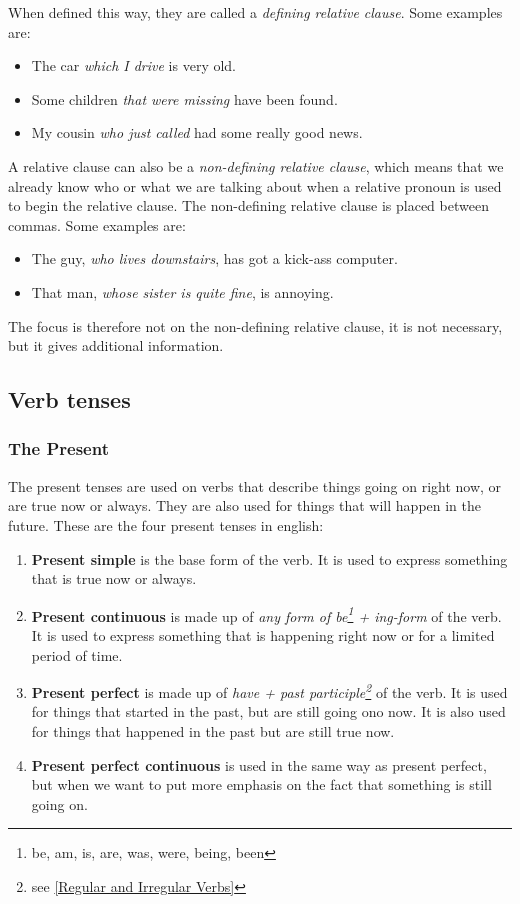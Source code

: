 When defined this way, they are called a \textit{defining relative clause}. Some examples are:

\begin{itemize}
    \item The car \textit{which I drive} is very old. 
    \item Some children \textit{that were missing} have been found.
    \item My cousin \textit{who just called} had some really good news.
\end{itemize}

A relative clause can also be a \textit{non-defining relative clause}, which means that we already know who or what we are talking about when a relative pronoun is used to begin the relative clause. The non-defining relative clause is placed between commas. Some examples are:

\begin{itemize}
    \item The guy, \textit{who lives downstairs}, has got a kick-ass computer.
    \item That man, \textit{whose sister is quite fine}, is annoying.
\end{itemize}

The focus is therefore not on the non-defining relative clause, it is not necessary, but it gives additional information.


\newpage
\subsection{Verb tenses}
\subsubsection{The Present}
The present tenses are used on verbs that describe things going on right now, or are true now or always. They are also used for things that will happen in the future. These are the four present tenses in english:

\begin{enumerate}
    \item \textbf{Present simple} is the base form of the verb. It is used to express something that is true now or always.
    \item \textbf{Present continuous} is made up of \textit{any form of be\footnote{be, am, is, are, was, were, being, been} + ing-form} of the verb. It is used to express something that is happening right now or for a limited period of time.
    \item \textbf{Present perfect} is made up of \textit{have + past participle\footnote{see \ref{Regular and Irregular Verbs}}} of the verb. It is used for things that started in the past, but are still going ono now. It is also used for things that happened in the past but are still true now.
    \item \textbf{Present perfect continuous} is used in the same way as present perfect, but when we want to put more emphasis on the fact that something is still going on.
\end{enumerate}

